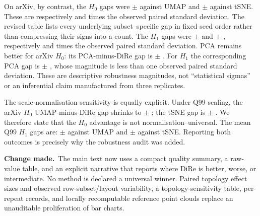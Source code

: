 \documentclass[11pt]{article}
\newcommand{\change}{%
  \noindent\textcolor{responseblue}{\textbf{Change made.}}\ }
\begin{document}
On arXiv, by contrast, the $H_0$ gaps were
\ArxivUmapMinusDireBetaZeroDtwGap{}$\pm$
\ArxivUmapMinusDireBetaZeroDtwGapSd{} against UMAP and
\ArxivTsneMinusDireBetaZeroDtwGap{}$\pm$
\ArxivTsneMinusDireBetaZeroDtwGapSd{} against tSNE. These are respectively
\ArxivUmapMinusDireBetaZeroDtwGapInObservedSd{} and
\ArxivTsneMinusDireBetaZeroDtwGapInObservedSd{} times the observed paired
standard deviation. The revised table lists every underlying subset--specific
gap in fixed seed order rather than compressing their signs into a count. The $H_1$
gaps were
\ArxivUmapMinusDireBetaOneDtwGap{}$\pm$
\ArxivUmapMinusDireBetaOneDtwGapSd{} and
\ArxivTsneMinusDireBetaOneDtwGap{}$\pm$
\ArxivTsneMinusDireBetaOneDtwGapSd{}, respectively
\ArxivUmapMinusDireBetaOneDtwGapInObservedSd{} and
\ArxivTsneMinusDireBetaOneDtwGapInObservedSd{} times the observed paired
standard deviation. PCA remains
better for arXiv $H_0$: its PCA-minus-DiRe gap is
\ArxivPcaMinusDireBetaZeroDtwGap{}$\pm$
\ArxivPcaMinusDireBetaZeroDtwGapSd{}. For $H_1$ the corresponding PCA gap is
\ArxivPcaMinusDireBetaOneDtwGap{}$\pm$
\ArxivPcaMinusDireBetaOneDtwGapSd{}, whose magnitude is less than one observed
paired standard deviation. These are descriptive robustness magnitudes, not
``statistical sigmas'' or an inferential claim manufactured from three
replicates.

The scale-normalisation sensitivity is equally explicit. Under Q99 scaling,
the arXiv $H_0$ UMAP-minus-DiRe gap shrinks to
\ArxivUmapMinusDireBetaZeroQNinetyNineDtwGap{}$\pm$
\ArxivUmapMinusDireBetaZeroQNinetyNineDtwGapSd{}; the tSNE
gap is
\ArxivTsneMinusDireBetaZeroQNinetyNineDtwGap{}$\pm$
\ArxivTsneMinusDireBetaZeroQNinetyNineDtwGapSd{}.
We therefore state that the $H_0$ advantage is not
normalisation--universal. The mean Q99 $H_1$ gaps are:
\ArxivUmapMinusDireBetaOneQNinetyNineDtwGap{}$\pm$
\ArxivUmapMinusDireBetaOneQNinetyNineDtwGapSd{} against UMAP and
\ArxivTsneMinusDireBetaOneQNinetyNineDtwGap{}$\pm$
\ArxivTsneMinusDireBetaOneQNinetyNineDtwGapSd{} against tSNE. Reporting both outcomes
is precisely why the robustness audit was added.

\change The main text now uses a compact quality summary, a raw-value table,
and an explicit narrative that reports where DiRe is better, worse, or
intermediate. No method is declared a universal winner. Paired topology effect
sizes and observed row-subset/layout variability, a topology-sensitivity
table, per-repeat records, and locally recomputable reference point clouds
replace an
unauditable proliferation of bar charts.
\end{document}
